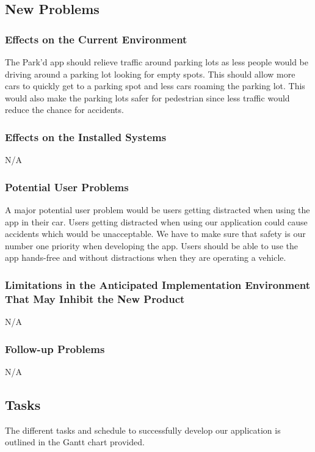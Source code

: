 \documentclass[12pt,letterpaper]{article}
\begin{document}
\subsection{New Problems}
\subsubsection{Effects on the Current Environment}
The Park'd app should relieve traffic around parking lots as less people would
be driving around a parking lot looking for empty spots. This should allow more
cars to quickly get to a parking spot and less cars roaming the parking lot.
This would also make the parking lots safer for pedestrian since less traffic
would reduce the chance for accidents.

\subsubsection{Effects on the Installed Systems}
N/A

\subsubsection{Potential User Problems}
A major potential user problem would be users getting distracted when using the
app in their car. Users getting distracted when using our application could
cause accidents which would be unacceptable. We have to make sure that safety is
our number one priority when developing the app. Users should be able to use the
app hands-free and without distractions when they are operating a vehicle.

\subsubsection{Limitations in the Anticipated Implementation Environment That May Inhibit the New Product}

N/A

\subsubsection{Follow-up Problems}

N/A

\subsection{Tasks}
\label{subsec:Tasks}
The different tasks and schedule to successfully develop our application is
outlined in the Gantt chart provided.
\end{document}
